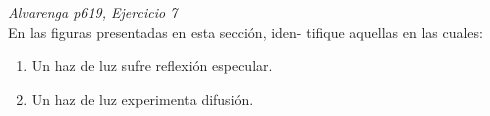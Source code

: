 \textit{Alvarenga p619, Ejercicio 7}\\En las figuras presentadas en esta sección, iden- tifique aquellas en las cuales:
\begin{enumerate}
    \item Un haz de luz sufre reflexión especular.
    \item Un haz de luz experimenta difusión.
\end{enumerate}